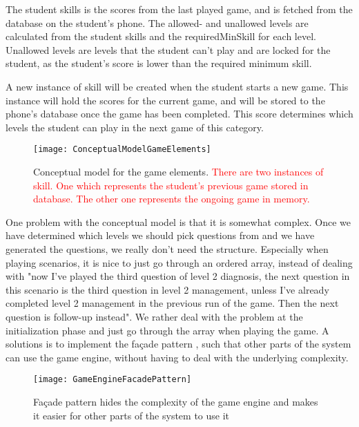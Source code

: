 The student skills is the scores from the last played game, and is fetched from the database on the student's phone. The allowed- and unallowed levels are calculated from the student skills and the requiredMinSkill for each level. Unallowed levels are levels that the student can't play and are locked for the student, as the student's score is lower than the required minimum skill.

A new instance of skill will be created when the student starts a new game. This instance will hold the scores for the current game, and will be stored to the phone's database once the game has been completed. This score determines which levels the student can play in the next game of this category.


\begin{figure}[h!]
	\texttt{[image: ConceptualModelGameElements]}
	\caption {Conceptual model for the game elements. \textcolor{red}{There are two instances of skill. One which represents the student's previous game stored in database. The other one represents the ongoing game in memory.}}
	\label{fig:ConceptualGameElements}
\end{figure}

One problem with the conceptual model is that it is somewhat complex. Once we have determined which levels we should pick questions from and we have generated the questions, we really don't need the structure. Especially when playing scenarios, it is nice to just go through an ordered array, instead of dealing with "now I've played the third question of level 2 diagnosis, the next question in this scenario is the third question in level 2 management, unless I've already completed level 2 management in the previous run of the game. Then the next question is follow-up instead". We rather deal with the problem at the initialization phase and just go through the array when playing the game. A solutions is to implement the façade pattern \parencite{Gamma1994}, such that other parts of the system can use the game engine, without having to deal with the underlying complexity. 


\begin{figure}[h!]
	\texttt{[image: GameEngineFacadePattern]}
	\caption {Façade pattern hides the complexity of the game engine and makes it easier for other parts of the system to use it}
	\label{fig:GameEngineFacadePattern}
\end{figure}

